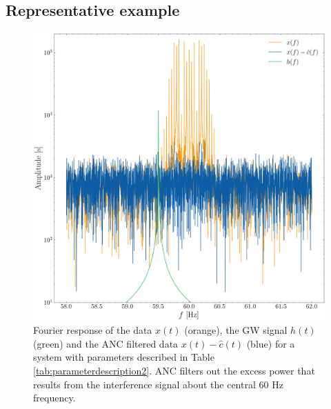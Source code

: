 \documentclass[pra,superscriptaddress,reprint,amsmath,amssymb,nofootinbib]{revtex4-2}
\begin{document}
\subsection{Representative example} \label{sec:representative_example}
\begin{figure}
	\begin{center}
		\includegraphics[width=\columnwidth]{images/spectrum.png}
	\end{center}
	\caption{Fourier response of the data $x(t)$ (orange), the GW signal $h(t)$ (green) and the ANC filtered data $x(t) - \hat{c}(t)$ (blue) for a system with parameters described in Table \ref{tab:parameterdescription2}. ANC filters out the excess power that results from the interference signal about the central 60 Hz frequency.}
	\label{fig:spectrum}
\end{figure}
\end{document}
